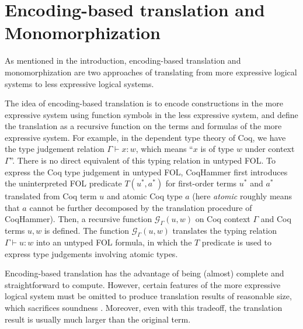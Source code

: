 \section{Encoding-based translation and Monomorphization}\label{subencmon}

  As mentioned in the introduction, encoding-based translation and monomorphization
  are two approaches of translating from more expressive logical systems to
  less expressive logical systems.

  The idea of encoding-based translation is to encode
  constructions in the more expressive system using function symbols in the less
  expressive system, and define the translation as a recursive function on the terms and formulas
  of the more expressive system. For example, in the dependent type theory of Coq,
  we have the type judgement relation $\Gamma \vdash x : w$, which means ``$x$ is of
  type $w$ under context $\Gamma$''. There is no direct equivalent of this
  typing relation in untyped FOL. To express the Coq type judgement in untyped FOL, 
  CoqHammer first introduces the uninterpreted FOL predicate $T(u^*, a^*)$ for
  first-order terms $u^*$ and $a^*$ translated from Coq term $u$ and atomic Coq type $a$
  (here \textit{atomic} roughly means that $a$ cannot be
  further decomposed by the translation procedure of CoqHammer). Then, a recursive function
  $\mathcal{G}_\Gamma(u, w)$ on Coq context $\Gamma$ and Coq terms $u, w$ is defined.
  The function $\mathcal{G}_\Gamma(u, w)$ translates the typing relation $\Gamma \vdash u : w$ into an untyped FOL formula,
  in which the $T$ predicate is used to express type judgements involving atomic types.
  
  Encoding-based translation has the advantage of being (almost) complete
  and straightforward to compute. However, certain features of the more expressive
  logical system must be omitted to produce translation results of reasonable size,
  which sacrifices soundness \cite{Czajka2018HammerFC}. Moreover, even with this tradeoff,
  the translation result is usually much larger than the original term.

